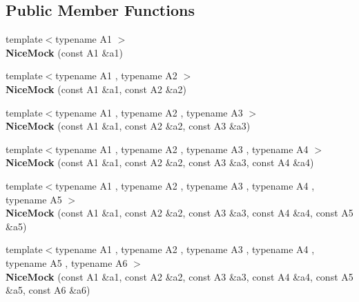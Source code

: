 \subsection*{Public Member Functions}
\begin{DoxyCompactItemize}
\item 
\mbox{\label{classtesting_1_1_nice_mock_a2d6b9cb9d929d1af4532b69c7ef19df6}} 
{\footnotesize template$<$typename A1 $>$ }\\{\bfseries Nice\+Mock} (const A1 \&a1)
\item 
\mbox{\label{classtesting_1_1_nice_mock_a150837476e88f52772c8f85180b889a1}} 
{\footnotesize template$<$typename A1 , typename A2 $>$ }\\{\bfseries Nice\+Mock} (const A1 \&a1, const A2 \&a2)
\item 
\mbox{\label{classtesting_1_1_nice_mock_a0b91bd74b497626bb81d07c3d4b59d22}} 
{\footnotesize template$<$typename A1 , typename A2 , typename A3 $>$ }\\{\bfseries Nice\+Mock} (const A1 \&a1, const A2 \&a2, const A3 \&a3)
\item 
\mbox{\label{classtesting_1_1_nice_mock_a5ffbe1a648f16612266d4e67a2d063d1}} 
{\footnotesize template$<$typename A1 , typename A2 , typename A3 , typename A4 $>$ }\\{\bfseries Nice\+Mock} (const A1 \&a1, const A2 \&a2, const A3 \&a3, const A4 \&a4)
\item 
\mbox{\label{classtesting_1_1_nice_mock_a3812c0ba0d743f9a0c3d276dfc076f4c}} 
{\footnotesize template$<$typename A1 , typename A2 , typename A3 , typename A4 , typename A5 $>$ }\\{\bfseries Nice\+Mock} (const A1 \&a1, const A2 \&a2, const A3 \&a3, const A4 \&a4, const A5 \&a5)
\item 
\mbox{\label{classtesting_1_1_nice_mock_a156d0fce85ac08abffdf4aa0c3975f81}} 
{\footnotesize template$<$typename A1 , typename A2 , typename A3 , typename A4 , typename A5 , typename A6 $>$ }\\{\bfseries Nice\+Mock} (const A1 \&a1, const A2 \&a2, const A3 \&a3, const A4 \&a4, const A5 \&a5, const A6 \&a6)

\end{DoxyCompactItemize}
